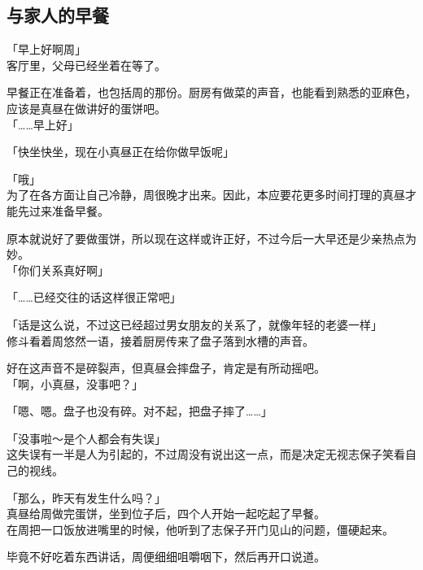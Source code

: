 \subsection{与家人的早餐}

「早上好啊周」\\

客厅里，父母已经坐着在等了。

早餐正在准备着，也包括周的那份。厨房有做菜的声音，也能看到熟悉的亚麻色，应该是真昼在做讲好的蛋饼吧。\\

「……早上好」

「快坐快坐，现在小真昼正在给你做早饭呢」

「哦」\\

为了在各方面让自己冷静，周很晚才出来。因此，本应要花更多时间打理的真昼才能先过来准备早餐。

原本就说好了要做蛋饼，所以现在这样或许正好，不过今后一大早还是少亲热点为妙。\\

「你们关系真好啊」

「……已经交往的话这样很正常吧」

「话是这么说，不过这已经超过男女朋友的关系了，就像年轻的老婆一样」\\

修斗看着周悠然一语，接着厨房传来了盘子落到水槽的声音。

好在这声音不是碎裂声，但真昼会摔盘子，肯定是有所动摇吧。\\

「啊，小真昼，没事吧？」

「嗯、嗯。盘子也没有碎。对不起，把盘子摔了……」

「没事啦～是个人都会有失误」\\

这失误有一半是人为引起的，不过周没有说出这一点，而是决定无视志保子笑看自己的视线。\\

\vspace{2\baselineskip}

「那么，昨天有发生什么吗？」\\

真昼给周做完蛋饼，坐到位子后，四个人开始一起吃起了早餐。\\

在周把一口饭放进嘴里的时候，他听到了志保子开门见山的问题，僵硬起来。

毕竟不好吃着东西讲话，周便细细咀嚼咽下，然后再开口说道。\\

